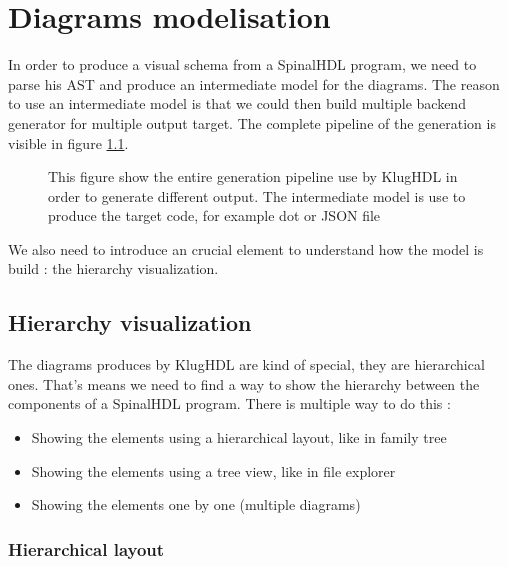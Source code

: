\chapter{Diagrams modelisation}

In order to produce a visual schema from a SpinalHDL program, we need to parse
his AST and produce an intermediate model for the diagrams. The reason to use
an intermediate model is that we could then build multiple backend generator
for multiple output target. The complete pipeline of the generation is visible
in figure \ref{fig:generation-pipeline}.

\begin{figure}[H] %
    \centering
    \caption[KlugHDL generation pipeline]{This figure show the entire generation
      pipeline use by KlugHDL in order to generate different output. The
      intermediate model is use to produce the target code, for example dot or
      JSON file}
    \label{fig:generation-pipeline}
\end{figure} %

We also need to introduce an crucial element to understand how the model is
build : the hierarchy visualization.

\section{Hierarchy visualization}

The diagrams produces by KlugHDL are kind of special, they are hierarchical
ones. That's means we need to find a way to show the hierarchy between the
components of a SpinalHDL program. There is multiple way to do this :
\begin{itemize}
  \item Showing the elements using a hierarchical layout, like in family tree
  \item Showing the elements using a tree view, like in file explorer
  \item Showing the elements one by one (multiple diagrams)
\end{itemize}

\subsection{Hierarchical layout}
\label{sec:hierarchical-layout}

